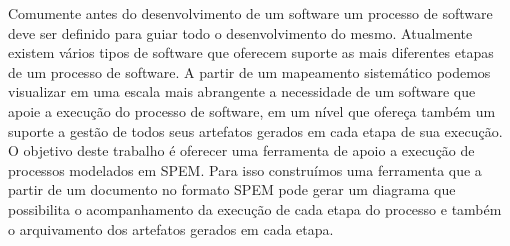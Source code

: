 \begin{resumo}%
 
 Comumente antes do desenvolvimento de um software um processo de software deve ser definido para guiar todo o desenvolvimento do mesmo. Atualmente existem vários tipos de software que oferecem suporte as mais diferentes etapas de um processo de software. A partir de um mapeamento sistemático podemos visualizar em uma escala mais abrangente a necessidade de um software que apoie a execução do processo de software, em um nível que ofereça também um suporte a gestão de todos seus artefatos gerados em cada etapa de sua execução. O objetivo deste trabalho é oferecer uma ferramenta de apoio a execução de processos modelados em SPEM. Para isso construímos uma ferramenta que a partir de um documento no formato SPEM pode gerar um diagrama que possibilita o acompanhamento da execução de cada etapa do processo e também o arquivamento dos artefatos gerados em cada etapa.
 

\end{resumo}
